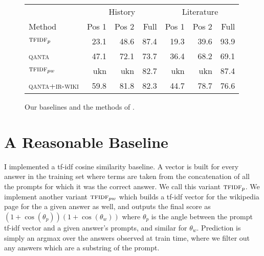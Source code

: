 \documentclass[12pt]{article}
\begin{document}
\begin{figure*}
\begin{center}
\begin{tabular}{l|r|r|r|r|r|r}
                        & \multicolumn{3}{c}{History}             & \multicolumn{3}{c}{Literature}  \\
Method                  &   Pos 1     & Pos 2       & Full        & Pos 1     & Pos 2     & Full    \\
\hline
$\textsc{tfidf}_p$      &   23.1      & 48.6        & 87.4        & 19.3      & 39.6      & 93.9   \\
\textsc{qanta}          &   47.1      & 72.1        & 73.7        & 36.4      & 68.2      & 69.1    \\
\hline
$\textsc{tfidf}_{pw}$   &   ukn       & ukn         & 82.7        & ukn       & ukn       & 87.4   \\
\textsc{qanta+ir-wiki}  &   59.8      & 81.8        & 82.3        & 44.7      & 78.7      & 76.6    \\
\end{tabular}
\end{center}
\caption{Our baselines and the methods of .}
\end{figure*}

\section{A Reasonable Baseline}
I implemented a tf-idf cosine similarity baseline.
A vector is built for every answer in the training set where
terms are taken from the concatenation of all the prompts for which
it was the correct answer.
We call this variant $\textsc{tfidf}_p$.
We implement another variant $\textsc{tfidf}_{pw}$ which builds
a tf-idf vector for the wikipedia page for the a given answer as well,
and outputs the final score as $(1+\cos(\theta_p)) (1 + \cos(\theta_w))$
where $\theta_p$ is the angle between the prompt tf-idf vector and
a given answer's prompts, and similar for $\theta_w$.
Prediction is simply an argmax over the answers observed at train time,
where we filter out any answers which are a substring of the prompt.

% 
% 
% 
\end{document}
